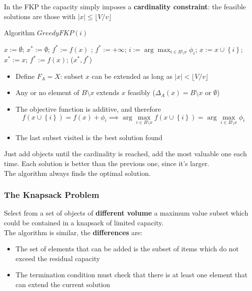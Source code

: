 \documentclass[11pt]{article}
\begin{document}
	In the FKP the capacity simply imposes a \textbf{cardinality constraint}: the feasible solutions are those with $|x| \leq \lfloor V / v \rfloor$
	
	\begin{algorithm}
		\caption{Algorithm $GreedyFKP(i)$}
		\begin{algorithmic}
			\STATE $x := \emptyset$; $x^\ast := \emptyset$;
				\STATE $f^\ast := f(x)$ ;
			\ELSE
				\STATE $f^\ast := + \infty$;
			\ENDIF
				\STATE $i:= \arg \max_{i \in B \setminus x} \phi_i$;
				\STATE $x := x \cup \left\{i\right\}$;
					\STATE $x^\ast := x$; $f^\ast := f(x)$;
				\ENDIF
			\ENDWHILE
			\RETURN ($x^\ast, f^\ast$)
		\end{algorithmic}
	\end{algorithm}
	
	\begin{itemize}
		\item Define $F_A = X$: subset $x$ can be extended as long as $|x| < \lfloor V/v \rfloor$
		\item Any or no element of $B \setminus x$ extends $x$ feasibly ($\Delta_A (x) = B \setminus x$ or $\emptyset$)
		\item The objective function is additive, and therefore
		$$ f(x \cup \left\{i\right\}) = f(x) + \phi_i \implies \arg \max_{i \in B \setminus x} f(x \cup \left\{i\right\}) = \arg \max_{i \in B \setminus x} \phi_i $$
		\item The last subset visited is the best solution found
	\end{itemize}
	Just add objects until the cardinality is reached, add the most valuable one each time. Each solution is better than the previous one, since it's larger.\\
	
	The algorithm always finds the optimal solution.\\
	
	\newpage
	
	\subsubsection{The Knapsack Problem} 
	Select from a set of objects of \textbf{different volume} a maximum value subset which could be contained in a knapsack of limited capacity.\\
	
	The algorithm is similar, the \textbf{differences} are:
	\begin{itemize}
		\item The set of elements that can be added is the subset of items which do not exceed the residual capacity
		
		\item The termination condition must check that there is at least one element that can extend the current solution
	\end{itemize}
	
\end{document}
